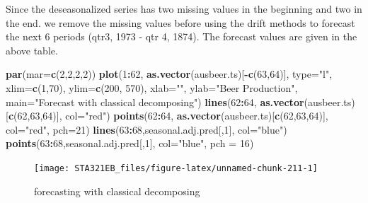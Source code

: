 \documentclass[
]{book}
\newenvironment{Shaded}{\begin{snugshade}}{\end{snugshade}}
\newcommand{\AttributeTok}[1]{\textcolor[rgb]{0.13,0.29,0.53}{#1}}
\newcommand{\DecValTok}[1]{\textcolor[rgb]{0.00,0.00,0.81}{#1}}
\newcommand{\FunctionTok}[1]{\textcolor[rgb]{0.13,0.29,0.53}{\textbf{#1}}}
\newcommand{\NormalTok}[1]{#1}
\newcommand{\SpecialCharTok}[1]{\textcolor[rgb]{0.81,0.36,0.00}{\textbf{#1}}}
\newcommand{\StringTok}[1]{\textcolor[rgb]{0.31,0.60,0.02}{#1}}
\begin{document}
Since the deseasonalized series has two missing values in the beginning and two in the end. we remove the missing values before using the drift methods to forecast the next 6 periods (qtr3, 1973 - qtr 4, 1874). The forecast values are given in the above table.

\begin{Shaded}
\begin{Highlighting}[]
\FunctionTok{par}\NormalTok{(}\AttributeTok{mar=}\FunctionTok{c}\NormalTok{(}\DecValTok{2}\NormalTok{,}\DecValTok{2}\NormalTok{,}\DecValTok{2}\NormalTok{,}\DecValTok{2}\NormalTok{))}
\FunctionTok{plot}\NormalTok{(}\DecValTok{1}\SpecialCharTok{:}\DecValTok{62}\NormalTok{, }\FunctionTok{as.vector}\NormalTok{(ausbeer.ts)[}\SpecialCharTok{{-}}\FunctionTok{c}\NormalTok{(}\DecValTok{63}\NormalTok{,}\DecValTok{64}\NormalTok{)], }\AttributeTok{type=}\StringTok{"l"}\NormalTok{, }\AttributeTok{xlim=}\FunctionTok{c}\NormalTok{(}\DecValTok{1}\NormalTok{,}\DecValTok{70}\NormalTok{), }\AttributeTok{ylim=}\FunctionTok{c}\NormalTok{(}\DecValTok{200}\NormalTok{, }\DecValTok{570}\NormalTok{),}
     \AttributeTok{xlab=}\StringTok{""}\NormalTok{, }\AttributeTok{ylab=}\StringTok{"Beer Production"}\NormalTok{, }\AttributeTok{main=}\StringTok{"Forecast with classical decomposing"}\NormalTok{)}
\FunctionTok{lines}\NormalTok{(}\DecValTok{62}\SpecialCharTok{:}\DecValTok{64}\NormalTok{,  }\FunctionTok{as.vector}\NormalTok{(ausbeer.ts)[}\FunctionTok{c}\NormalTok{(}\DecValTok{62}\NormalTok{,}\DecValTok{63}\NormalTok{,}\DecValTok{64}\NormalTok{)], }\AttributeTok{col=}\StringTok{"red"}\NormalTok{)}
\FunctionTok{points}\NormalTok{(}\DecValTok{62}\SpecialCharTok{:}\DecValTok{64}\NormalTok{,  }\FunctionTok{as.vector}\NormalTok{(ausbeer.ts)[}\FunctionTok{c}\NormalTok{(}\DecValTok{62}\NormalTok{,}\DecValTok{63}\NormalTok{,}\DecValTok{64}\NormalTok{)], }\AttributeTok{col=}\StringTok{"red"}\NormalTok{, }\AttributeTok{pch=}\DecValTok{21}\NormalTok{)}
\FunctionTok{lines}\NormalTok{(}\DecValTok{63}\SpecialCharTok{:}\DecValTok{68}\NormalTok{,seasonal.adj.pred[,}\DecValTok{1}\NormalTok{], }\AttributeTok{col=}\StringTok{"blue"}\NormalTok{)}
\FunctionTok{points}\NormalTok{(}\DecValTok{63}\SpecialCharTok{:}\DecValTok{68}\NormalTok{,seasonal.adj.pred[,}\DecValTok{1}\NormalTok{], }\AttributeTok{col=}\StringTok{"blue"}\NormalTok{, }\AttributeTok{pch =} \DecValTok{16}\NormalTok{)}
\end{Highlighting}
\end{Shaded}

\begin{figure}

{\centering \texttt{[image: STA321EB\_files/figure-latex/unnamed-chunk-211-1]} 

}

\caption{forecasting with classical decomposing}\label{fig:unnamed-chunk-211}
\end{figure}
\end{document}
